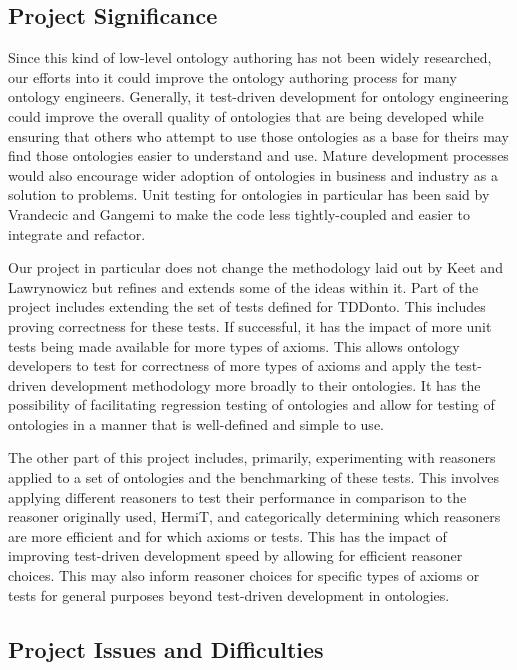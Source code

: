 \documentclass[draft]{sig-alternate}
\begin{document}
\subsection{Project Significance}

Since this kind of low-level ontology authoring has not been widely researched, our efforts into it could improve the ontology authoring process for many ontology engineers. Generally, it test-driven development for ontology engineering could improve the overall quality of ontologies that are being developed while ensuring that others who attempt to use those ontologies as a base for theirs may find those ontologies easier to understand and use. Mature development processes would also encourage wider adoption of ontologies in business and industry as a solution to problems. Unit testing for ontologies in particular has been said by Vrandecic and Gangemi\cite{DBLP:conf/otm/VrandecicG06} to make the code less tightly-coupled and easier to integrate and refactor.

Our project in particular does not change the methodology laid out by Keet and Lawrynowicz\cite{DBLP:journals/corr/KeetL15} but refines and extends some of the ideas within it. Part of the project includes extending the set of tests defined for TDDonto. This includes proving correctness for these tests. If successful, it has the impact of more unit tests being made available for more types of axioms. This allows ontology developers to test for correctness of more types of axioms and apply the test-driven development methodology more broadly to their ontologies. It has the possibility of facilitating regression testing of ontologies and allow for testing of ontologies in a manner that is well-defined and simple to use\cite{DBLP:conf/otm/VrandecicG06}.

The other part of this project includes, primarily, experimenting with reasoners applied to a set of ontologies and the benchmarking of these tests. This involves applying different reasoners to test their performance in comparison to the reasoner originally used, HermiT, and categorically determining which reasoners are more efficient and for which axioms or tests. This has the impact of improving test-driven development speed by allowing for efficient reasoner choices. This may also inform reasoner choices for specific types of axioms or tests for general purposes beyond test-driven development in ontologies.

\subsection{Project Issues and Difficulties}
\end{document}
